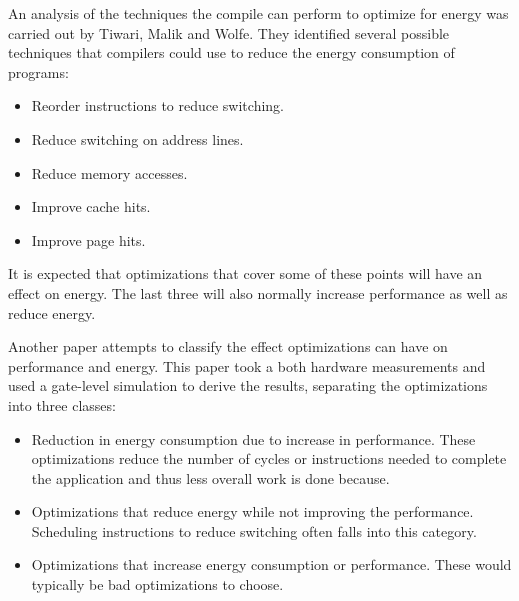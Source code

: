 \documentclass[twocolumn]{article}
\begin{document}
An analysis of the techniques the compile can perform to optimize for energy was carried out by Tiwari, Malik and Wolfe\cite{CompilationTechniquesForLowEnergy}. They identified several possible techniques that compilers could use to reduce the energy consumption of programs:
\begin{itemize}
	\setlength{\itemsep}{0em}
	\vspace{-1mm}

	\item Reorder instructions to reduce switching.
	\item Reduce switching on address lines.
	\item Reduce memory accesses.
	\item Improve cache hits.
	\item Improve page hits.
\end{itemize}

It is expected that optimizations that cover some of these points will have an effect on energy. The last three will also normally increase performance as well as reduce energy.

Another paper attempts to classify the effect optimizations can have on performance and energy\cite{WhatCanAPoorCompilerDo}. This paper took a both hardware measurements and used a gate-level simulation to derive the results,  separating the optimizations into three classes:
\begin{itemize}
	\setlength{\itemsep}{0em}
	\vspace{-1mm}
	\item Reduction in energy consumption due to increase in performance. These optimizations reduce the number of cycles or instructions needed to complete the application and thus less overall work is done because.
	\item Optimizations that reduce energy while not improving the performance. Scheduling instructions to reduce switching often falls into this category.
	\item Optimizations that increase energy consumption or performance. These would typically be bad optimizations to choose.
\end{itemize}
\end{document}
